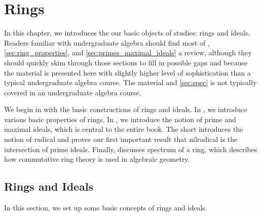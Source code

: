 \chapter{Rings}
\label{chap:rings}
In this chapter, we introduces the our basic objects of studies:
rings and ideals. 
Readers familiar with undergraduate algebra should 
find most of , \ref{sec:ring_properties},
and \ref{sec:primes_maximal_ideals} a review,
although they should quickly skim through those sections 
to fill in possible gaps and because the material is presented 
here with slightly higher level of sophistication than 
a typical undergraduate algebra course.
The material  and \ref{sec:spec} 
is not typically covered in an undergraduate algebra course.

We begin in  with the basic 
constructions of rings and ideals.
In , we introduce various 
basic properties of rings.
In , we introduce the 
notion of prime and maximal ideals, which is central to 
the entire book.
The short  introduces the notion 
of radical and proves our first important result that 
nilradical is the intersection of prime ideals.
Finally,  discusses spectrum of a ring,
which describes how commutative ring theory is used in algebraic geometry.


\section{Rings and Ideals}
\label{sec:rings_ideals}
In this section, we set up some basic concepts of rings and ideals.
